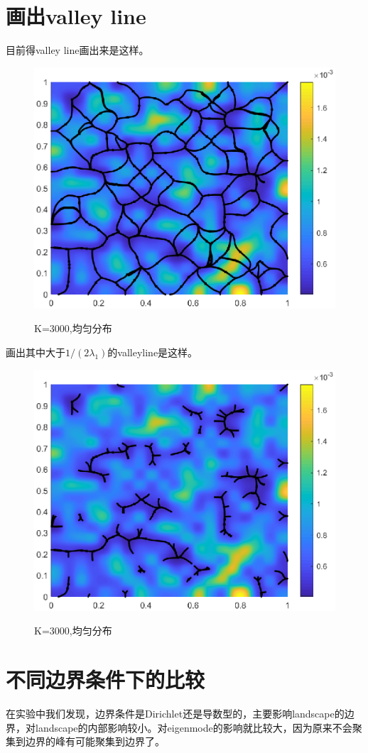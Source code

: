 \documentclass[UTF8,12pt]{article}
\begin{document}
\section{画出valley line}

目前得valley line画出来是这样。
\begin{figure}[htbp]
    \centering
    \includegraphics[width=0.4\linewidth]{pic/vline2}
    \label{figv1}
\caption{K=3000,均匀分布}
\end{figure}

画出其中大于$1/(2\lambda_1)$的valleyline是这样。
\begin{figure}[htbp]
    \centering
    \includegraphics[width=0.4\linewidth]{pic/vline3}
    \label{figv2}
\caption{K=3000,均匀分布}
\end{figure}

\section{不同边界条件下的比较}

在实验中我们发现，边界条件是Dirichlet还是导数型的，主要影响landscape的边界，对landscape的内部影响较小。对eigenmode的影响就比较大，因为原来不会聚集到边界的峰有可能聚集到边界了。
\end{document}
